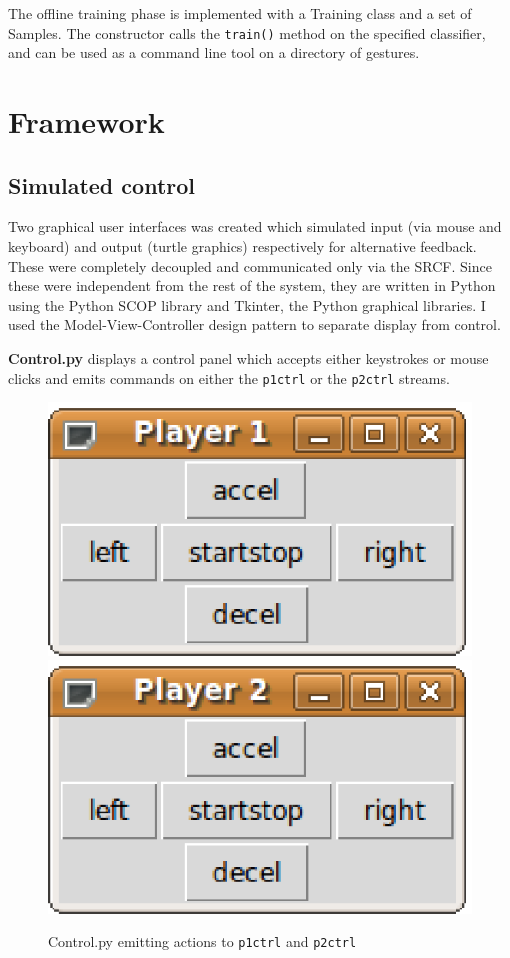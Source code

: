 \documentclass[12pt,a4,notitlepage]{report}
\renewcommand{\_}{\texttt{\symbol{95}}}
\newcommand{\<}{\texttt{\symbol{60}}}
\renewcommand{\>}{\texttt{\symbol{62}}}
\newcommand{\class}[1]{\textbf{#1}}
\newcommand{\scopendpoint}[1]{\texttt{#1}}
\newcommand{\variable}[1]{\texttt{#1}}
\begin{document}
{The offline training phase is implemented with a Training class and a set of Samples. The constructor calls the \variable{train()} method on the specified classifier, and can be used as a command line tool on a directory of gestures.

\section{Framework}

\subsection{Simulated control}

Two graphical user interfaces was created which simulated input (via mouse and keyboard) and output (turtle graphics) respectively for alternative feedback. These were completely decoupled and communicated only via the SRCF. Since these were independent from the rest of the system, they are written in Python using the Python SCOP library and Tkinter, the Python graphical libraries. I used the Model-View-Controller design pattern to separate display from control.

\class{Control.py} displays a control panel which accepts either keystrokes or mouse clicks and emits commands on either the \scopendpoint{p1ctrl} or the \scopendpoint{p2ctrl} streams.

\begin{figure}[hb]
\centering
\includegraphics[scale=0.5,angle=0]{images/ControlP1.ps}
\includegraphics[scale=0.5,angle=0]{images/ControlP2.ps}
\caption{Control.py emitting actions to \scopendpoint{p1ctrl} and \scopendpoint{p2ctrl}}
\label{control}
\end{figure}

}
\end{document}
